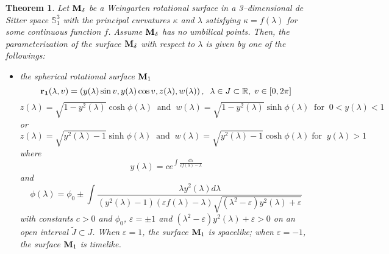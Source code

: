 \documentclass{amsart}
\newtheorem{Theorem}{Theorem}[section]
\theoremstyle{definition}
\numberwithin{equation}{section}
\begin{document}
\begin{Theorem}
\label{Weingarten1}
Let ${\bf M}_\delta$ be a Weingarten rotational surface in a 3--dimensional de Sitter space $\mathbb{S}^3_1$ 
with the principal curvatures $\kappa$ and $\lambda$ satisfying $\kappa=f(\lambda)$ 
for some continuous function $f$.
Assume ${\bf M}_\delta$ has no umbilical points. 
Then, the parameterization of the surface ${\bf M}_\delta$ with respect to $\lambda$ 
is given by one of the followings:
\begin{itemize}
    \item [(i.)] the spherical rotational surface 
    ${\bf M}_1$
    \begin{equation}
\label{spherical1}
    {\bf{r}_1}(\lambda,v)=\left(y(\lambda)\sin{v}, y(\lambda)\cos{v},z(\lambda),w(\lambda)\right),
    \;\;\lambda\in J\subset\mathbb{R},\;v\in[0,2\pi]
    \end{equation}
    \begin{equation}
    \label{spherical3}
      z(\lambda)=\sqrt{1-y^2(\lambda)}\cosh{\phi(\lambda)}\;\;\mbox{and}\;\; 
    w(\lambda)=\sqrt{1-y^2(\lambda)}\sinh{\phi(\lambda)}\;\;
    \mbox{for}\;\; 0<y(\lambda)<1  
    \end{equation}
    or 
    \begin{equation}
    \label{spherical4}
    z(\lambda)=\sqrt{y^2(\lambda)-1}\sinh{\phi(\lambda)}\;\;\mbox{and}\;\; 
    w(\lambda)=\sqrt{y^2(\lambda)-1}\cosh{\phi(\lambda)}
    \;
    \mbox{for}\;\; y(\lambda)>1
    \end{equation}
    where 
    \begin{equation}
\label{spherical2}
y(\lambda)=ce^{\int{\frac{d\lambda}{\varepsilon f(\lambda)-\lambda}}}
\end{equation}
and 
\begin{equation}
\label{spherical5}
    \phi(\lambda)=\phi_0\pm\int{\frac{\lambda y^2(\lambda)d\lambda}{(y^2(\lambda)-1)(\varepsilon f(\lambda)-\lambda)
    \sqrt{(\lambda^2-\varepsilon)y^2(\lambda)+\varepsilon}}}
\end{equation}
with constants $c>0$ and $\phi_0$, $\varepsilon=\pm 1$ and $(\lambda^2-\varepsilon)y^2(\lambda)+\varepsilon>0$ on an open interval $\tilde{J}\subset J$.
When $\varepsilon=1$, 
the surface ${\bf M}_1$ is spacelike; 
when 
$\varepsilon=-1$, the surface ${\bf M}_1$ is timelike. 


\end{itemize}
\end{Theorem}
\end{document}
